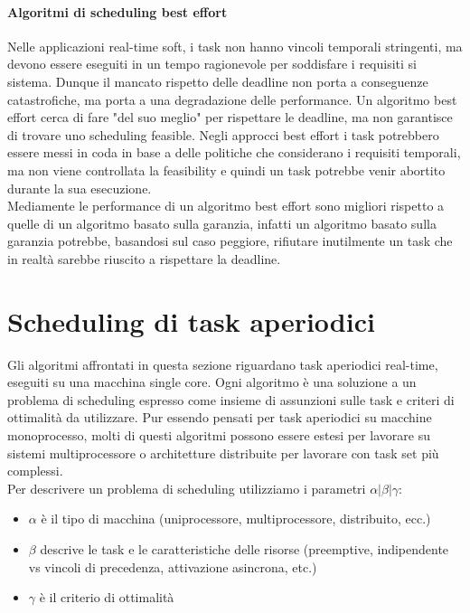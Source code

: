 \documentclass[12pt,openany,onesided]{book}
\begin{document}
\subsubsection{Algoritmi di scheduling best effort}
Nelle applicazioni real-time soft, i task non hanno vincoli temporali stringenti, ma devono essere eseguiti in un tempo ragionevole per soddisfare i requisiti si sistema.
Dunque il mancato rispetto delle deadline non porta a conseguenze catastrofiche, ma porta a una degradazione delle performance.
Un algoritmo best effort cerca di fare "del suo meglio" per rispettare le deadline, ma non garantisce di trovare uno scheduling feasible.
Negli approcci best effort i task potrebbero essere messi in coda in base a delle politiche che considerano i requisiti temporali, ma non viene controllata la feasibility e quindi un task potrebbe venir abortito durante la sua esecuzione.\\
Mediamente le performance di un algoritmo best effort sono migliori rispetto a quelle di un algoritmo basato sulla garanzia, infatti un algoritmo basato sulla garanzia
potrebbe, basandosi sul caso peggiore, rifiutare inutilmente un task che in realtà sarebbe riuscito a rispettare la deadline.

\chapter{Scheduling di task aperiodici}
Gli algoritmi affrontati in questa sezione riguardano task aperiodici real-time, eseguiti su una macchina single core.
Ogni algoritmo è una soluzione a un problema di scheduling espresso come insieme di assunzioni sulle task e criteri di ottimalità da utilizzare.
Pur essendo pensati per task aperiodici su macchine monoprocesso, molti di questi algoritmi possono essere estesi per lavorare su sistemi multiprocessore o architetture distribuite per lavorare con task set più complessi.
\\
Per descrivere un problema di scheduling utilizziamo i parametri $\alpha|\beta|\gamma$:
\begin{itemize}
\item $\alpha$ è il tipo di macchina (uniprocessore, multiprocessore, distribuito, ecc.)
\item $\beta$ descrive le task e le caratteristiche delle risorse (preemptive, indipendente vs vincoli di precedenza, attivazione asincrona, etc.)
\item $\gamma$ è il criterio di ottimalità
\end{itemize}
\end{document}
